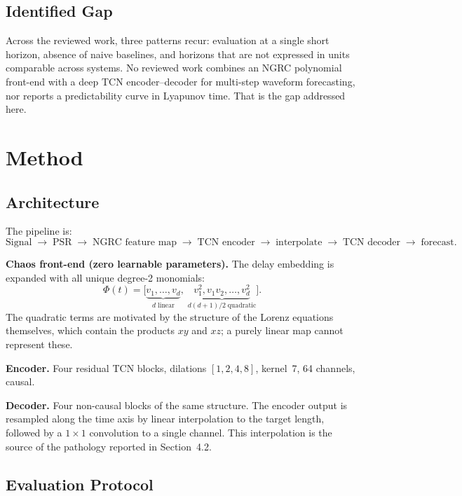 \documentclass[11pt,a4paper]{article}
\begin{document}
\subsection{Identified Gap}

Across the reviewed work, three patterns recur: evaluation at a single short horizon, absence of naive baselines, and horizons that are not expressed in units comparable across systems.
No reviewed work combines an NGRC polynomial front-end with a deep TCN encoder--decoder for multi-step waveform forecasting, nor reports a predictability curve in Lyapunov time.
That is the gap addressed here.


\section{Method}

\subsection{Architecture}

The pipeline is:
\[
\text{Signal} \;\to\; \text{PSR} \;\to\; \text{NGRC feature map} \;\to\; \text{TCN encoder} \;\to\; \text{interpolate} \;\to\; \text{TCN decoder} \;\to\; \text{forecast.}
\]

\textbf{Chaos front-end (zero learnable parameters).}
The delay embedding is expanded with all unique degree-2 monomials:
\begin{equation}
  \Phi(t) = \bigl[\underbrace{v_1, \ldots, v_d}_{d\;\text{linear}},\; \underbrace{v_1^2, v_1 v_2, \ldots, v_d^2}_{d(d+1)/2\;\text{quadratic}}\bigr].
\end{equation}
The quadratic terms are motivated by the structure of the Lorenz equations themselves, which contain the products $xy$ and $xz$; a purely linear map cannot represent these.

\textbf{Encoder.} Four residual TCN blocks, dilations $[1, 2, 4, 8]$, kernel~7, 64 channels, causal.

\textbf{Decoder.} Four non-causal blocks of the same structure.
The encoder output is resampled along the time axis by linear interpolation to the target length, followed by a $1 \times 1$ convolution to a single channel.
This interpolation is the source of the pathology reported in Section~4.2.

\subsection{Evaluation Protocol}
\end{document}
